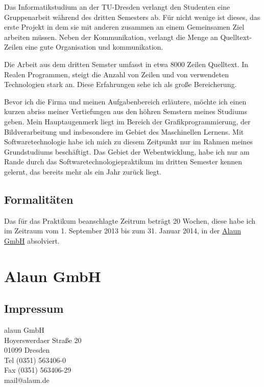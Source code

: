 \documentclass{scrartcl}
\begin{document}
Das Informatikstudium an der TU-Dresden verlangt den Studenten eine Gruppenarbeit während des dritten Semesters
ab. Für nicht wenige ist dieses, das erste Projekt in dem sie mit anderen zusammen an einem Gemeinsamen Ziel
arbeiten müssen. Neben der Kommunikation, verlangt die Menge an Quelltext-Zeilen eine gute Organisation und
kommunikation. 

Die Arbeit aus dem dritten Semster umfasst in etwa 8000 Zeilen Quelltext. In Realen Programmen, steigt die
Anzahl von Zeilen und von verwendeten Technologien stark an. Diese Erfahrungen sehe ich als große Bereicherung.

Bevor ich die Firma und meinen Aufgabenbereich erläutere, möchte ich einen kurzen abriss meiner Vertiefungen
aus den höhren Semstern meines Studiums geben. Mein Hauptaugenmerk liegt im Bereich der Grafikprogrammierung,
der Bildverarbeitung und insbesondere im Gebiet des Maschinellen Lernens. Mit Softwaretechnologie habe ich mich
zu diesem Zeitpunkt nur im Rahmen meines Grundstudiums beschäftigt. Das Gebiet der Webentwicklung, habe ich nur
am Rande durch das Softwaretechnologiepraktikum im dritten Semester kennen gelernt, das bereits mehr als ein
Jahr zurück liegt. 

\subsection{Formalitäten}

Das für das Praktikum beanschlagte Zeitrum beträgt 20 Wochen, diese habe ich im Zeitraum vom 1. September 2013
bis zum 31. Januar 2014, in der \href{https://alaun.de/home/}{Alaun GmbH} absolviert.

\section{Alaun GmbH}

\subsection{Impressum}

\begin{minipage}{\linewidth}

alaun GmbH \\
Hoyerswerdaer Straße 20 \\
01099 Dresden \\

Tel (0351) 563406-0  \\
Fax (0351) 563406-29 \\

mail@alaun.de 

\end{minipage}
\end{document}
